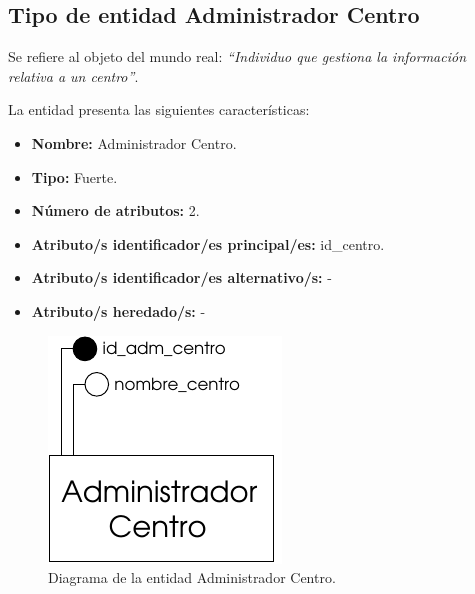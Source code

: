 \subsection{Tipo de entidad Administrador Centro}

   \begin{description}

   \item[Definición] Se refiere al objeto del mundo real: \emph{``Individuo que
    gestiona la información relativa a un centro''}.

   \item[Características] La entidad presenta las siguientes características:
      \begin{itemize}
         \item \textbf{Nombre:} Administrador Centro.
         \item \textbf{Tipo:} Fuerte.
         \item \textbf{Número de atributos:} 2.
         \item \textbf{Atributo/s identificador/es principal/es:} id\_centro.
         \item \textbf{Atributo/s identificador/es alternativo/s:} -
         \item \textbf{Atributo/s heredado/s:} -
      \end{itemize}

   \item[Diagrama]
   \item \begin{figure}[h!]
            \begin{center}
            \includegraphics[]{07.Modelo_Entidad-Interrelacion/7.2.Analisis_Entidades/diagramas/adm_centro.pdf}
            \caption{Diagrama de la entidad Administrador Centro.}
            \end{center}
         \end{figure}


\end{description}
